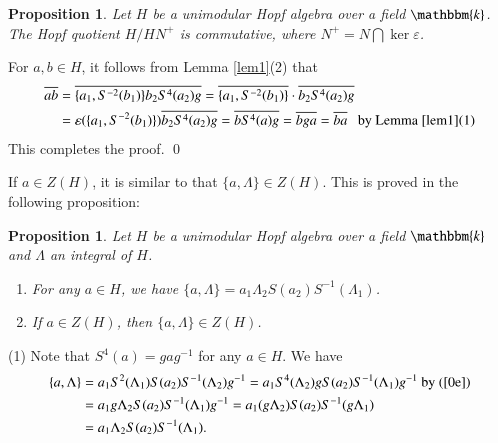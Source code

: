 \documentclass[11pt]{amsart}
\newtheorem{prop}[thm]{Proposition}
\numberwithin{equation}{section}
\begin{document}
\begin{prop}Let $H$ be a unimodular Hopf algebra over a field $\mathbbm{k}$. The Hopf quotient $H/HN^{+}$ is commutative, where $N^+=N\bigcap \ker \varepsilon$. 
\end{prop}
\proof For $a,b\in H$, it follows from Lemma \ref{lem1}(2) that 
\begin{align*}
\overline{ab}&=\overline{\{a_1,S^{-2}(b_1)\}b_2S^4(a_2)g}
=\overline{\{a_1,S^{-2}(b_1)\}} \cdot \overline{b_2S^4(a_2)g}\\
&=\varepsilon(\{a_1,S^{-2}(b_1)\})\overline{b_2S^4(a_2)g}
=\overline{bS^4(a)g}=\overline{bga}
=\overline{ba}\ \ \ \text{by\ Lemma \ref{lem1}(1)} 
\end{align*}
This completes the proof.
\qed




If $a\in Z(H)$, it is similar to \cite[Lemma 2.3]{Cohen} that $\{a,\Lambda\}\in Z(H)$. This is proved in the  following proposition:
\begin{prop}\label{p1}Let $H$ be a unimodular Hopf algebra over a field $\mathbbm{k}$ and $\Lambda$ an integral of $H$. 
\begin{enumerate}
  \item For any $a\in H$, we have $\{a,\Lambda\}=a_1\Lambda_2S(a_2)S^{-1}(\Lambda_1)$.
  \item If $a\in Z(H)$, then $\{a,\Lambda\}\in Z(H)$.
\end{enumerate}
\end{prop}
\proof (1) Note that $S^4(a)=gag^{-1}$ for any $a\in H$. We have
\begin{align*}\{a,\Lambda\}&=a_{1}S^2(\Lambda_{1})S(a_{2})S^{-1}(\Lambda_{2})g^{-1}
=a_{1}S^4(\Lambda_{2})gS(a_{2})S^{-1}(\Lambda_{1})g^{-1}\ \text{by}\ (\ref{0e})\\
&=a_{1}g\Lambda_{2}S(a_{2})S^{-1}(\Lambda_{1})g^{-1}
=a_{1}(g\Lambda_{2})S(a_{2})S^{-1}(g\Lambda_{1})\\
&=a_{1}\Lambda_{2}S(a_{2})S^{-1}(\Lambda_{1}).
\end{align*}
\end{document}

